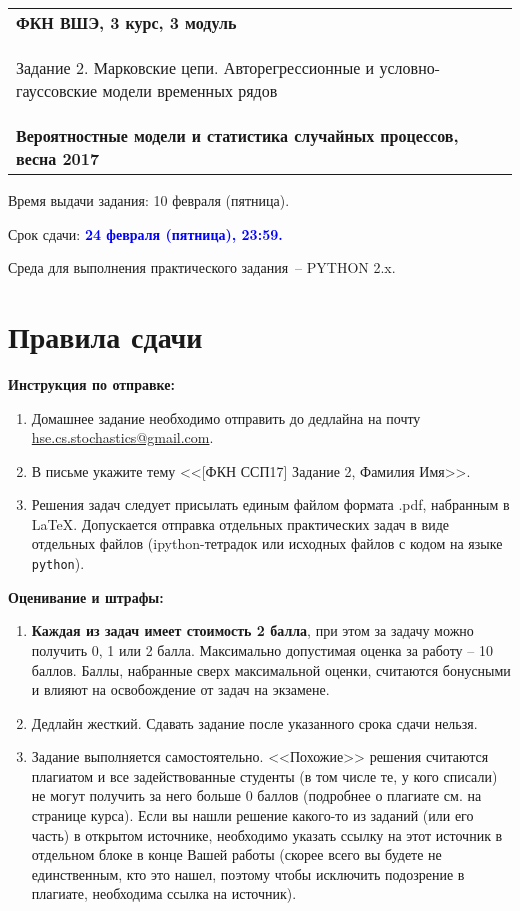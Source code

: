 \documentclass[a4paper,14pt]{extreport}
\renewcommand{\=}[1]{\stackrel{#1}{=}} %
\begin{document}
\begin{center}
    \begin{tabular}{|p{15.5cm}|}
        \hline
        \textbf{ФКН ВШЭ, 3 курс, 3 модуль}\\
        \begin{center} \Large Задание 2. Марковские цепи. Авторегрессионные
        и условно-гауссовские модели временных рядов
        \end{center}\\
        \textbf{Вероятностные модели и статистика случайных процессов, весна 2017}\\
        \hline
    \end{tabular}
\end{center}

Время выдачи задания: 10 февраля (пятница).

Срок сдачи: \textcolor{blue}{\bf 24 февраля (пятница), 23:59.}

Среда для выполнения практического задания~-- PYTHON 2.x.

\section*{Правила сдачи}

\textbf{Инструкция по отправке:} 
\begin{enumerate}
\item Домашнее задание необходимо отправить
до дедлайна на почту \href{mailto:hse.cs.stochastics@gmail.com}
{hse.cs.stochastics@gmail.com}.
\item В письме укажите тему 
<<[ФКН ССП17] Задание 2, Фамилия Имя>>.
\item Решения задач следует присылать единым файлом
формата .pdf, набранным в \LaTeX. Допускается отправка
отдельных практических задач в виде отдельных файлов (ipython-тетрадок
или исходных файлов с кодом на языке \texttt{python}).
\end{enumerate}

\textbf{Оценивание и штрафы:} 
\begin{enumerate}
\item \textbf{Каждая из задач имеет стоимость 2 балла}, при этом
за задачу можно получить 0, 1 или 2 балла.
Максимально допустимая оценка за работу -- 10 баллов. 
Баллы, набранные сверх максимальной оценки, 
считаются бонусными и влияют на освобождение от задач на экзамене.
\item Дедлайн жесткий. Сдавать задание после указанного
срока сдачи нельзя.
\item Задание выполняется самостоятельно.
<<Похожие>> решения считаются плагиатом и все задействованные
студенты (в том числе те, у кого списали) не могут получить
за него больше 0 баллов (подробнее о плагиате см. на странице курса).
Если вы нашли решение какого-то из заданий (или его часть)
в открытом источнике, необходимо указать ссылку на этот источник
в отдельном блоке в конце Вашей работы (скорее всего вы будете не
единственным, кто это нашел, поэтому чтобы исключить подозрение
в плагиате, необходима ссылка на источник).
\end{enumerate}
\end{document}
